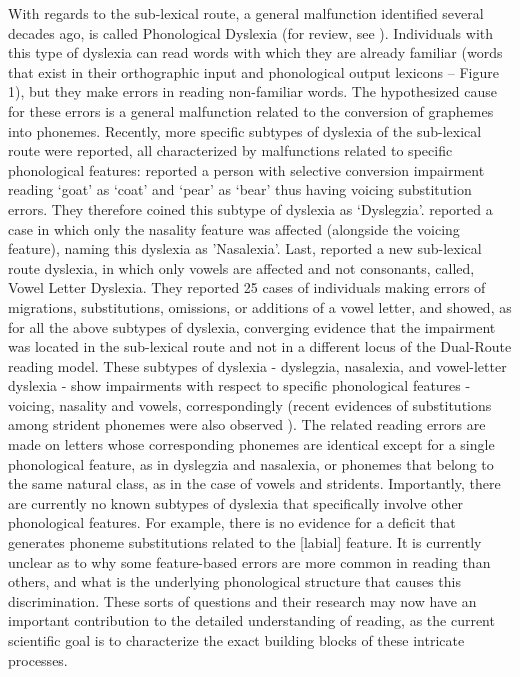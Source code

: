 With regards to the sub-lexical route, a general malfunction identified several decades ago, is called Phonological Dyslexia (for review, see \citealp{c96}). Individuals with this type of dyslexia can read words with which they are already familiar (words that exist in their orthographic input and phonological output lexicons – Figure 1), but they make errors in reading non-familiar words. The hypothesized cause for these errors is a general malfunction related to the conversion of graphemes into phonemes. Recently, more specific subtypes of dyslexia of the sub-lexical route were reported, all characterized by malfunctions related to specific phonological features: \citet{Gvion2010} reported a person with selective conversion impairment reading ‘goat’ as ‘coat’ and ‘pear’ as ‘bear’ thus having voicing substitution errors. They therefore coined this subtype of dyslexia as ‘Dyslegzia’. \citet{Gvion2012} reported  a case in which only the nasality feature was affected (alongside the voicing feature), naming this dyslexia as 'Nasalexia'. Last, \citet{kf11} reported a new sub-lexical route dyslexia, in which only vowels are affected and not consonants, called, Vowel Letter Dyslexia. They reported 25 cases of individuals making errors of migrations, substitutions, omissions, or additions of a vowel letter, and showed, as for all the above subtypes of dyslexia, converging evidence that the impairment was located in the sub-lexical route and not in a different locus of the Dual-Route reading model. These subtypes of dyslexia - dyslegzia, nasalexia, and vowel-letter dyslexia - show impairments with respect to specific phonological features - voicing, nasality and vowels, correspondingly (recent evidences of substitutions among strident phonemes were also observed \citealp{Gvion2010}). The related reading errors are made on letters whose corresponding phonemes are identical except for a single phonological feature, as in dyslegzia and nasalexia, or phonemes that belong to the same natural class, as in the case of vowels and stridents. Importantly, there are currently no known subtypes of dyslexia that specifically involve other phonological features. For example, there is no evidence for a deficit that generates phoneme substitutions related to the [labial] feature. It is currently unclear as to why some feature-based errors are more common in reading than others, and what is the underlying phonological structure that causes this discrimination. These sorts of questions and their research may now have an important contribution to the detailed understanding of reading, as the current scientific goal is to characterize the exact building blocks of these intricate processes.

